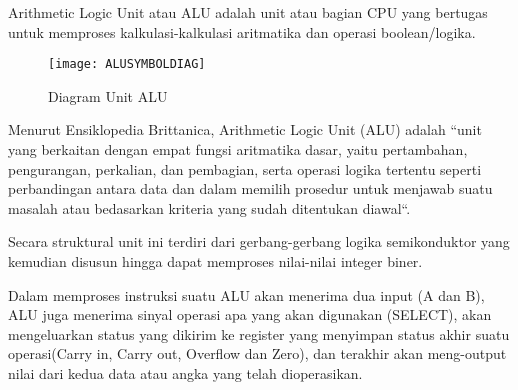 Arithmetic Logic Unit atau ALU adalah unit atau bagian CPU yang bertugas untuk
memproses kalkulasi-kalkulasi aritmatika dan operasi boolean/logika.

\begin{figure}[h]
    \centering
    \texttt{[image: ALUSYMBOLDIAG]}
    \caption{Diagram Unit ALU}
    \label{fig:ALUSYMBOLDIAG}
\end{figure}


Menurut Ensiklopedia Brittanica, Arithmetic Logic Unit (ALU) adalah ``unit yang
berkaitan dengan empat fungsi aritmatika dasar, yaitu pertambahan, pengurangan,
perkalian, dan pembagian, serta operasi logika tertentu seperti perbandingan antara data
dan dalam memilih prosedur untuk menjawab suatu masalah atau bedasarkan kriteria yang
sudah ditentukan diawal``.

Secara struktural unit ini terdiri dari gerbang-gerbang logika semikonduktor
yang kemudian disusun hingga dapat memproses nilai-nilai integer biner.

Dalam memproses instruksi suatu ALU akan menerima dua input (A dan B),
ALU juga menerima sinyal operasi apa yang akan digunakan (SELECT),
akan mengeluarkan status yang dikirim ke register yang menyimpan
status akhir suatu operasi(Carry in, Carry out, Overflow dan Zero),
dan terakhir akan meng-output nilai dari kedua data atau angka yang telah dioperasikan.
